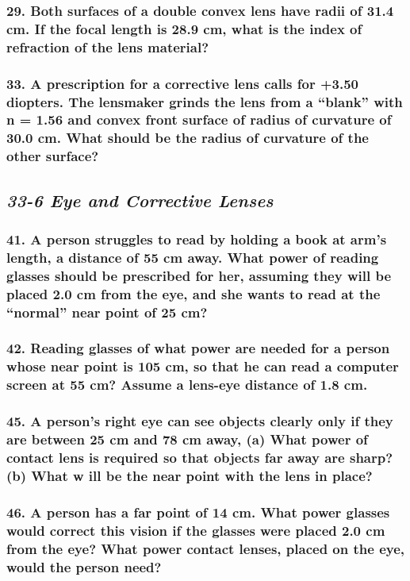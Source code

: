 \documentclass{article}
\begin{document}
\subsubsection*{
    29. Both surfaces of a double convex lens have radii of 31.4 cm. If the focal length is 28.9 cm, what is
    the index of refraction of the lens material?
}
\subsubsection*{
    33. A prescription for a corrective lens calls for +3.50 diopters. The lensmaker grinds the lens from a
    “blank” with n = 1.56 and convex front surface of radius of curvature of 30.0 cm. What should be the radius
    of curvature of the other surface?
}
\newpage
\begin{center}
    \subsection*{\textbf{\textit{33-6 Eye and Corrective Lenses}}}
\end{center}
\subsubsection*{
    41. A person struggles to read by holding a book at arm’s length, a distance of 55 cm away. What power of
    reading glasses should be prescribed for her, assuming they will be placed 2.0 cm from the eye, and she
    wants to read at the “normal” near point of 25 cm?
}
\subsubsection*{
    42. Reading glasses of what power are needed for a person whose near point is 105 cm, so that he can read
    a computer screen at 55 cm? Assume a lens-eye distance of 1.8 cm.
}
\subsubsection*{
    45. A person’s right eye can see objects clearly only if they are between 25 cm and 78 cm away, (a) What
    power of contact lens is required so that objects far away are sharp? (b) What w ill be the near point
    with the lens in place? 
}
\subsubsection*{
    46. A person has a far point of 14 cm. What power glasses would correct this vision if the glasses were
    placed 2.0 cm from the eye? What power contact lenses, placed on the eye, would the person need?
}
\end{document}

